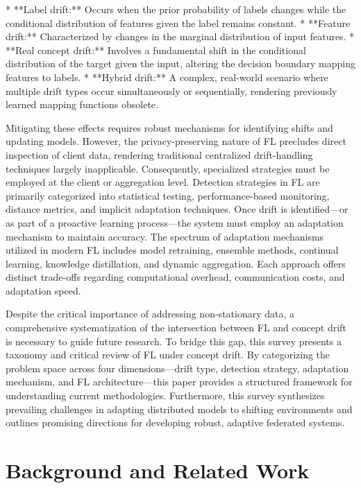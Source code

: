 \documentclass[journal]{IEEEtran}
\begin{document}
*   **Label drift:** Occurs when the prior probability of labels changes while the conditional distribution of features given the label remains constant.
*   **Feature drift:** Characterized by changes in the marginal distribution of input features.
*   **Real concept drift:** Involves a fundamental shift in the conditional distribution of the target given the input, altering the decision boundary mapping features to labels.
*   **Hybrid drift:** A complex, real-world scenario where multiple drift types occur simultaneously or sequentially, rendering previously learned mapping functions obsolete.

Mitigating these effects requires robust mechanisms for identifying shifts and updating models. However, the privacy-preserving nature of FL precludes direct inspection of client data, rendering traditional centralized drift-handling techniques largely inapplicable. Consequently, specialized strategies must be employed at the client or aggregation level. Detection strategies in FL are primarily categorized into statistical testing, performance-based monitoring, distance metrics, and implicit adaptation techniques. Once drift is identified—or as part of a proactive learning process—the system must employ an adaptation mechanism to maintain accuracy. The spectrum of adaptation mechanisms utilized in modern FL includes model retraining, ensemble methods, continual learning, knowledge distillation, and dynamic aggregation. Each approach offers distinct trade-offs regarding computational overhead, communication costs, and adaptation speed.

Despite the critical importance of addressing non-stationary data, a comprehensive systematization of the intersection between FL and concept drift is necessary to guide future research. To bridge this gap, this survey presents a taxonomy and critical review of FL under concept drift. By categorizing the problem space across four dimensions—drift type, detection strategy, adaptation mechanism, and FL architecture—this paper provides a structured framework for understanding current methodologies. Furthermore, this survey synthesizes prevailing challenges in adapting distributed models to shifting environments and outlines promising directions for developing robust, adaptive federated systems.

\section{Background and Related Work}
\label{sec:background}
\end{document}
